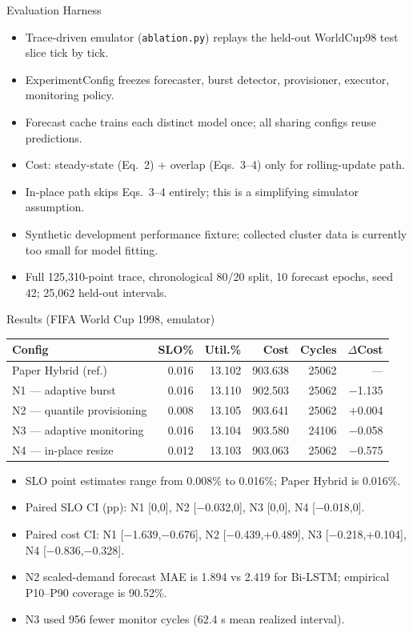 \documentclass[aspectratio=169,10pt]{beamer}
\begin{document}
\begin{frame}{Evaluation Harness}
\begin{itemize}
  \item Trace-driven emulator (\texttt{ablation.py}) replays the held-out WorldCup98 test slice tick by tick.
  \item ExperimentConfig freezes forecaster, burst detector, provisioner, executor, monitoring policy.
  \item Forecast cache trains each distinct model once; all sharing configs reuse predictions.
  \item Cost: steady-state (Eq.\ 2) + overlap (Eqs.\ 3--4) only for rolling-update path.
  \item In-place path skips Eqs.\ 3--4 entirely; this is a simplifying simulator assumption.
  \item Synthetic development performance fixture; collected cluster data is currently too small for model fitting.
  \item Full 125,310-point trace, chronological 80/20 split, 10 forecast epochs, seed 42; 25,062 held-out intervals.
\end{itemize}
\end{frame}

\begin{frame}{Results (FIFA World Cup 1998, emulator)}
\centering
\tiny
\begin{tabular}{lrrrrr}
\toprule
\textbf{Config} & \textbf{SLO\%} & \textbf{Util.\%} & \textbf{Cost} & \textbf{Cycles} & $\Delta$\textbf{Cost} \\
\midrule
Paper Hybrid (ref.) & 0.016 & 13.102 & 903.638 & 25062 & --- \\
N1 --- adaptive burst & 0.016 & 13.110 & 902.503 & 25062 & $-$1.135 \\
N2 --- quantile provisioning & 0.008 & 13.105 & 903.641 & 25062 & $+$0.004 \\
N3 --- adaptive monitoring & 0.016 & 13.104 & 903.580 & 24106 & $-$0.058 \\
N4 --- in-place resize & 0.012 & 13.103 & 903.063 & 25062 & $-$0.575 \\
\bottomrule
\end{tabular}
\vspace{0.3cm}

\normalsize
\begin{itemize}
  \small
  \item SLO point estimates range from 0.008\% to 0.016\%; Paper Hybrid is 0.016\%.
  \item Paired SLO CI (pp): N1 [0,0], N2 [$-$0.032,0], N3 [0,0], N4 [$-$0.018,0].
  \item Paired cost CI: N1 [$-$1.639,$-$0.676], N2 [$-$0.439,+0.489], N3 [$-$0.218,+0.104], N4 [$-$0.836,$-$0.328].
  \item N2 scaled-demand forecast MAE is 1.894 vs 2.419 for Bi-LSTM; empirical P10--P90 coverage is 90.52\%.
  \item N3 used 956 fewer monitor cycles (62.4 s mean realized interval).
\end{itemize}
\end{frame}
\end{document}
